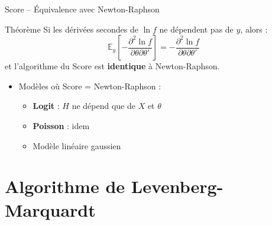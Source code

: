 \documentclass[11pt,aspectratio=169]{beamer}
\begin{document}
\begin{frame}{Score -- Équivalence avec Newton-Raphson}

\begin{alertblock}{Théorème}
Si les dérivées secondes de $\ln f$ ne dépendent pas de $y$, alors :
\[
\mathbb{E}_y\left[-\frac{\partial^2 \ln f}{\partial \theta \partial \theta'}\right] = -\frac{\partial^2 \ln f}{\partial \theta \partial \theta'}
\]
et l'algorithme du Score est \textbf{identique} à Newton-Raphson.
\end{alertblock}

\begin{itemize}

\item Modèles où Score = Newton-Raphson :
  \begin{itemize}
    \item \textbf{Logit} : $H$ ne dépend que de $X$ et $\theta$\newline
    \item \textbf{Poisson} : idem\newline
    \item Modèle linéaire gaussien
  \end{itemize}

\end{itemize}

\end{frame}

\section{Algorithme de Levenberg-Marquardt}
\end{document}
